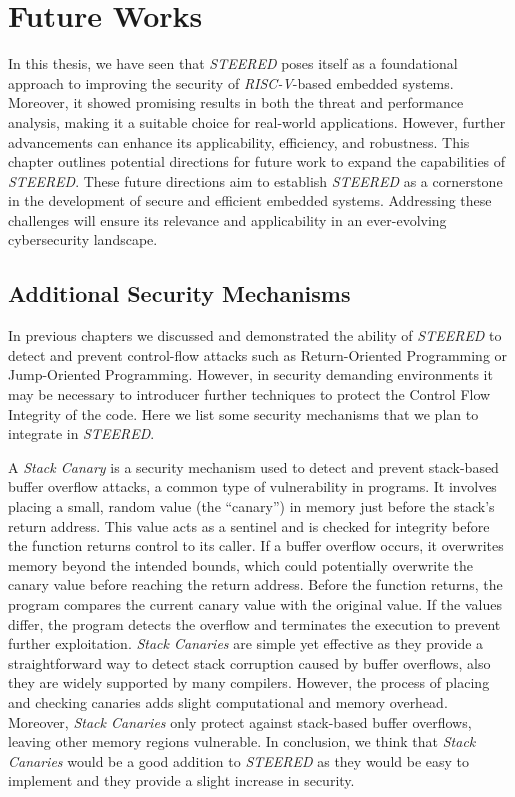 \chapter{Future Works}
\label{cha:future}

In this thesis, we have seen that \textit{STEERED} poses itself as a
foundational approach to improving the security of \textit{RISC-V}-based embedded
systems. Moreover, it showed promising results in both the threat and performance
analysis, making it a suitable choice for real-world applications. However,
further advancements can enhance its applicability, efficiency, and robustness. This
chapter outlines potential directions for future work to expand the capabilities
of \textit{STEERED}. These future directions aim to establish \textit{STEERED}
as a cornerstone in the development of secure and efficient embedded systems. Addressing
these challenges will ensure its relevance and applicability in an ever-evolving
cybersecurity landscape.

\section{Additional Security Mechanisms}
\label{sec:future_security}

In previous chapters we discussed and demonstrated the ability of \textit{STEERED}
to detect and prevent control-flow attacks such as Return-Oriented Programming or
Jump-Oriented Programming. However, in security demanding environments it may be
necessary to introducer further techniques to protect the Control Flow Integrity
of the code. Here we list some security mechanisms that we plan to integrate in
\textit{STEERED}.

A \textit{Stack Canary} is a security mechanism used to detect and prevent stack-based
buffer overflow attacks, a common type of vulnerability in programs. It involves
placing a small, random value (the ``canary'') in memory just before the stack's
return address. This value acts as a sentinel and is checked for integrity
before the function returns control to its caller. If a buffer overflow occurs,
it overwrites memory beyond the intended bounds, which could potentially overwrite
the canary value before reaching the return address. Before the function returns,
the program compares the current canary value with the original value. If the
values differ, the program detects the overflow and terminates the execution to prevent
further exploitation. \textit{Stack Canaries} are simple yet effective as they provide
a straightforward way to detect stack corruption caused by buffer overflows,
also they are widely supported by many compilers. However, the process of
placing and checking canaries adds slight computational and memory overhead. Moreover,
\textit{Stack Canaries} only protect against stack-based buffer overflows,
leaving other memory regions vulnerable. In conclusion, we think that \textit{Stack
Canaries} would be a good addition to \textit{STEERED} as they would be easy to
implement and they provide a slight increase in security.

